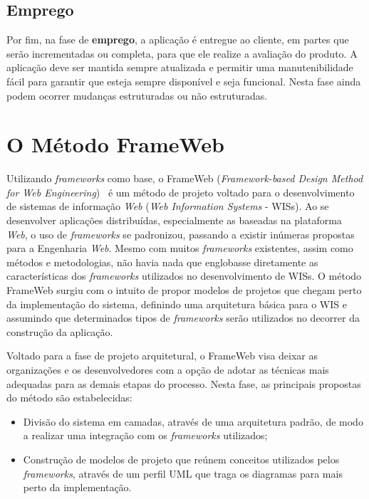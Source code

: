 \subsection{Emprego}
\label{sec-ref-emprego}

Por fim, na fase de \textbf{emprego}, a aplicação é entregue ao cliente, em partes que serão incrementadas ou completa, para que ele realize a avaliação do produto. A aplicação deve ser mantida sempre atualizada e permitir uma manutenibilidade fácil para garantir que esteja sempre disponível e seja funcional. Nesta fase ainda podem ocorrer mudanças estruturadas ou não estruturadas.

\section{O Método FrameWeb}
\label{sec-ref-frameweb}

Utilizando \textit{frameworks} como base, o FrameWeb (\textit{Framework-based Design Method for Web Engineering})~\cite{souza:masterthesis07,souza-celebratingfalbo20} é um método de projeto voltado para o desenvolvimento de sistemas de informação \textit{Web} (\textit{Web Information Systems} - WISs). Ao se desenvolver aplicações distribuídas, especialmente as baseadas na plataforma \textit{Web}, o uso de \textit{frameworks} se padronizou, passando a existir inúmeras propostas para a Engenharia \textit{Web}. Mesmo com muitos \textit{frameworks} existentes, assim como métodos e metodologias, não havia nada que englobasse diretamente as características dos \textit{frameworks} utilizados no desenvolvimento de WISs. O método FrameWeb surgiu com o intuito de propor modelos de projetos que chegam perto da implementação do sistema, definindo uma arquitetura básica para o WIS e assumindo que determinados tipos de \textit{frameworks} serão utilizados no decorrer da construção da aplicação.

Voltado para a fase de projeto arquitetural, o FrameWeb visa deixar as organizações e os desenvolvedores com a opção de adotar as técnicas mais adequadas para as demais etapas do processo. Nesta fase, as principais propostas do método são estabelecidas:
  
\begin{itemize}
	
	\item Divisão do sistema em camadas, através de uma arquitetura padrão, de modo a realizar uma integração com os \textit{frameworks} utilizados;
	
	\item Construção de modelos de projeto que reúnem conceitos utilizados pelos \textit{frameworks}, através de um perfil UML que traga os diagramas para mais perto da implementação.

\end{itemize}

